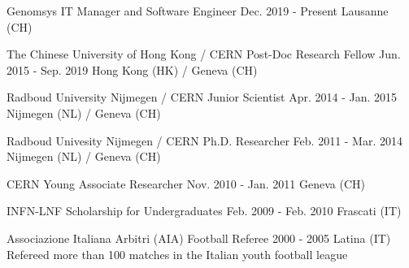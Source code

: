 
\begin{cventries}
\cventry
{Genomsys} %
{IT Manager and Software Engineer} %
{Dec. 2019 - Present} %
{Lausanne (CH)} %
{\Genomsys}

\cventry
{The Chinese University of Hong Kong / CERN} %
{Post-Doc Research Fellow} %
{Jun. 2015 - Sep. 2019} %
{Hong Kong (HK) / Geneva (CH)}
{\CHUK}

\cventry
{Radboud University Nijmegen / CERN} %
{Junior Scientist} %
{Apr. 2014 - Jan. 2015} %
{Nijmegen (NL) / Geneva (CH)} %
{\JuniorScientist}

\cventry
{Radboud Univesity Nijmegen / CERN} %
{Ph.D. Researcher} %
{Feb. 2011  - Mar. 2014} %
{Nijmegen (NL) / Geneva (CH)} %
{\Phd}

\cventry
{CERN} %
{Young Associate Researcher} %
{Nov. 2010 - Jan. 2011} %
{Geneva (CH)} %
{\CERN}

\cventry
{INFN-LNF} %
{Scholarship for Undergraduates} %
{Feb. 2009 - Feb. 2010} %
{Frascati (IT)} %
{\Master}

\cventry
{Associazione Italiana Arbitri (AIA)} %
{Football Referee} %
{2000 - 2005} %
{Latina (IT)} %
{Refereed more than 100 matches in the Italian youth football league}

\end{cventries}
